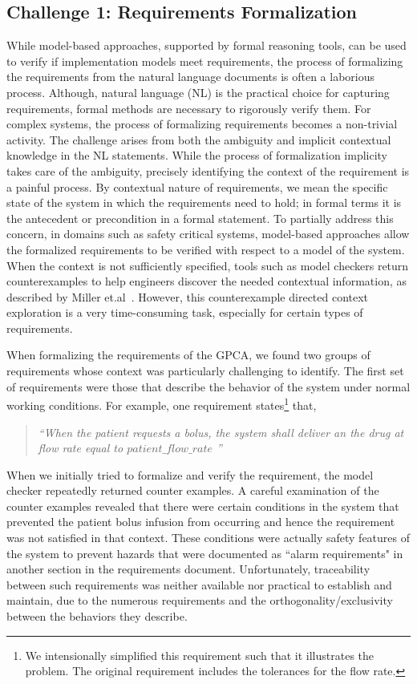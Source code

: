\subsection{Challenge 1: Requirements Formalization}

While model-based approaches, supported by formal reasoning tools, can be used to verify if implementation models meet requirements, the process of formalizing the requirements from the natural language documents is often a laborious process. Although, natural language (NL) is the practical choice for capturing requirements, formal methods are necessary to rigorously verify them. For complex systems, the process of formalizing requirements becomes a non-trivial activity. The challenge arises from both the ambiguity and implicit contextual knowledge in the NL statements. While the process of formalization implicity takes care of the ambiguity, precisely identifying the context of the requirement is a painful process. By contextual nature of requirements, we mean the specific state of the system in which the requirements need to hold; in formal terms it is the antecedent or precondition in a formal statement. To partially address this concern, in domains such as safety critical systems, model-based approaches allow the formalized requirements to be verified with respect to a model of the system. When the context is not sufficiently specified, tools such as model checkers return counterexamples to help engineers discover the needed contextual information, as described by Miller et.al~\cite{Miller03:shalls}. However, this counterexample directed context exploration is a very time-consuming task, especially for certain types of requirements.

When formalizing the requirements of the GPCA, we found two groups of requirements whose context was particularly challenging to identify. The first set of requirements were those that describe the behavior of the system under normal working conditions. For example, one requirement states\footnote{\scriptsize{We intensionally simplified this requirement such that it illustrates the problem. The original requirement includes the tolerances for the flow rate.}} that,

\begin{quotation}
\emph{``When the patient requests a bolus, the system shall deliver an the drug at flow rate equal to $patient\_flow\_rate$ ''}
\end{quotation}
\vspace{-0.05in}
When we initially tried to formalize and verify the requirement, the model checker repeatedly returned counter examples. A careful examination of the counter examples revealed that there were certain conditions in the system that prevented the patient bolus infusion from occurring and hence the requirement was not satisfied in that context. These conditions were actually safety features of the system to prevent hazards that were documented as ``alarm requirements" in another section in the requirements document.  Unfortunately, traceability between such requirements was neither available nor practical to establish and maintain, due to the numerous requirements and the orthogonality/exclusivity between the behaviors they describe.

